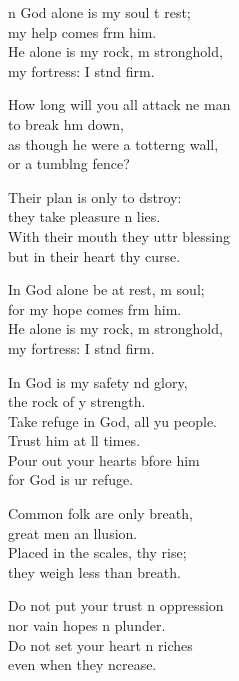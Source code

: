 \settowidth{\versewidth}{How long will you all attack one man *}
\begin{psalmverse}%
  \begin{patverse}
n God alone is my soul t rest;\Med\\
my help comes frm him.\\
He alone is my rock, m stronghold,\Med\\
my fortress: I stnd firm.

How long will you all attack ne man\Med\\
to break h\pointup{\i}m down,\\
as though he were a totter\pointup{\i}ng wall,\Med\\
or a tumbl\pointup{\i}ng fence?

Their plan is only to dstroy:\Med\\
they take pleasure \pointup{\i}n lies.\\
With their mouth they uttr blessing\Med\\
but in their heart thy curse.

In God alone be at rest, m soul;\Med\\
for my hope comes frm him.\\
He alone is my rock, m stronghold,\Med\\
my fortress: I stnd firm.

In God is my safety nd glory,\Med\\
the rock of y strength.\\
Take refuge in God, all yu people.\Med\\
Trust him at ll times.\\
Pour out your hearts bfore him\Med\\
for God is ur refuge.

Common folk are only  breath,\Med\\
great men an \pointup{\i}llusion.\\
Placed in the scales, thy rise;\Med\\
they weigh less than  breath.

Do not put your trust \pointup{\i}n oppression\Med\\
nor vain hopes n plunder.\\
Do not set your heart n riches\Med\\
even when they \pointup{\i}ncrease.


\end{patverse}
\end{psalmverse}

